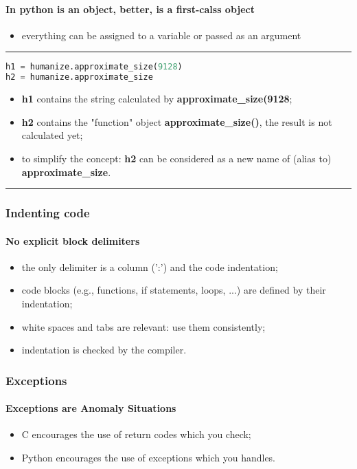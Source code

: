 \paragraph{In python is an object, better, is a \textbf{first-calss object}}
\begin{itemize}
	\item everything can be assigned to a variable or passed as an argument
\end{itemize}
\hrule
\begin{lstlisting}[language=Python]
h1 = humanize.approximate_size(9128)
h2 = humanize.approximate_size
\end{lstlisting}	
\begin{itemize}
	\item \textbf{h1} contains the string calculated by \textbf{approximate\_size(9128};
	\item \textbf{h2} contains the "function" object \textbf{approximate\_size()}, the result is not calculated yet;
	\item to simplify the concept: \textbf{h2} can be considered as a new name of (alias to) \textbf{approximate\_size}.
\end{itemize}
\hrule
\subsubsection{Indenting code}
\paragraph{No explicit block delimiters}
\begin{itemize}
	\item the only delimiter is a column (':') and the code indentation;
	\item code blocks (e.g., functions, if statements, loops, ...) are defined by their indentation;
	\item white spaces and tabs are relevant: use them consistently;
	\item indentation is checked by the compiler.
\end{itemize}
\subsubsection{Exceptions}
\paragraph{Exceptions are Anomaly Situations}
\begin{itemize}
	\item C encourages the use of return codes which you check;
	\item Python encourages the use of exceptions which you handles.
\end{itemize}

